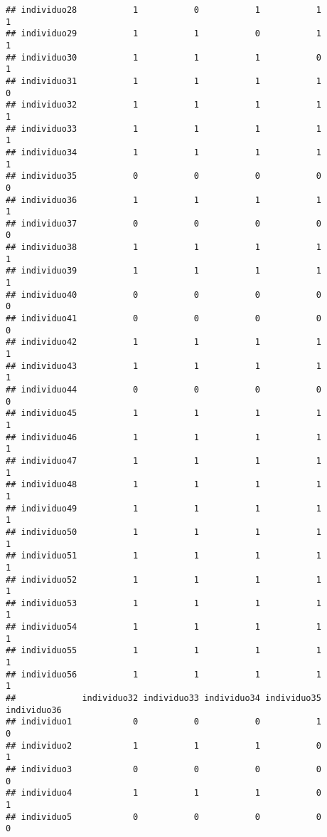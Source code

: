 \documentclass[
]{article}
\begin{document}
\begin{verbatim}
## individuo28           1           0           1           1           1
## individuo29           1           1           0           1           1
## individuo30           1           1           1           0           1
## individuo31           1           1           1           1           0
## individuo32           1           1           1           1           1
## individuo33           1           1           1           1           1
## individuo34           1           1           1           1           1
## individuo35           0           0           0           0           0
## individuo36           1           1           1           1           1
## individuo37           0           0           0           0           0
## individuo38           1           1           1           1           1
## individuo39           1           1           1           1           1
## individuo40           0           0           0           0           0
## individuo41           0           0           0           0           0
## individuo42           1           1           1           1           1
## individuo43           1           1           1           1           1
## individuo44           0           0           0           0           0
## individuo45           1           1           1           1           1
## individuo46           1           1           1           1           1
## individuo47           1           1           1           1           1
## individuo48           1           1           1           1           1
## individuo49           1           1           1           1           1
## individuo50           1           1           1           1           1
## individuo51           1           1           1           1           1
## individuo52           1           1           1           1           1
## individuo53           1           1           1           1           1
## individuo54           1           1           1           1           1
## individuo55           1           1           1           1           1
## individuo56           1           1           1           1           1
##             individuo32 individuo33 individuo34 individuo35 individuo36
## individuo1            0           0           0           1           0
## individuo2            1           1           1           0           1
## individuo3            0           0           0           0           0
## individuo4            1           1           1           0           1
## individuo5            0           0           0           0           0

\end{verbatim}
\end{document}
